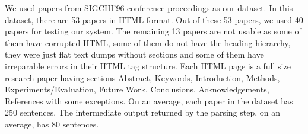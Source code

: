 We used papers from SIGCHI'96 conference proceedings as our dataset. In this dataset, there are 53 papers in HTML format. Out of these 53 papers, we used 40 papers for testing our system. The remaining 13 papers are not usable as some of them have corrupted HTML, some of them do not have the heading hierarchy, they were just flat text dumps without sections and some of them have irreparable errors in their HTML tag structure.
Each HTML page is a full size research paper having sections Abstract, Keywords, Introduction, Methods, Experiments/Evaluation, Future Work, Conclusions, Acknowledgements, References with some exceptions. On an average, each paper in the dataset has 250 sentences. The intermediate output returned by the parsing step, on an average, has 80 sentences.

